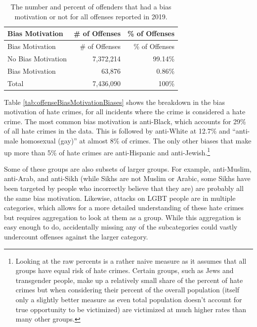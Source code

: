 \documentclass[
  12pt,
  openany]{book}
\begin{document}
\begin{longtable}[]{@{}lrr@{}}
\caption{\label{tab:offenseBiasMotivation}The number and percent of offenders that had a bias motivation or not for all offenses reported in 2019.}\tabularnewline
\toprule
Bias Motivation & \# of Offenses & \% of Offenses\tabularnewline
\midrule
\endfirsthead
\toprule
Bias Motivation & \# of Offenses & \% of Offenses\tabularnewline
\midrule
\endhead
No Bias Motivation & 7,372,214 & 99.14\%\tabularnewline
Bias Motivation & 63,876 & 0.86\%\tabularnewline
Total & 7,436,090 & 100\%\tabularnewline
\bottomrule
\end{longtable}

Table \ref{tab:offenseBiasMotivationBiases} shows the breakdown in the bias motivation of hate crimes, for all incidents where the crime is considered a hate crime. The most common bias motivation is anti-Black, which accounts for 29\% of all hate crimes in the data. This is followed by anti-White at 12.7\% and ``anti-male homosexual (gay)'' at almost 8\% of crimes. The only other biases that make up more than 5\% of hate crimes are anti-Hispanic and anti-Jewish.\footnote{Looking at the raw percents is a rather naive measure as it assumes that all groups have equal risk of hate crimes. Certain groups, such as Jews and transgender people, make up a relatively small share of the percent of hate crimes but when considering their percent of the overall population (itself only a slightly better measure as even total population doesn't account for true opportunity to be victimized) are victimized at much higher rates than many other groups.}

Some of these groups are also subsets of larger groups. For example, anti-Muslim, anti-Arab, and anti-Sikh (while Sikhs are not Muslim or Arabic, some Sikhs have been targeted by people who incorrectly believe that they are) are probably all the same bias motivation. Likewise, attacks on LGBT people are in multiple categories, which allows for a more detailed understanding of these hate crimes but requires aggregation to look at them as a group. While this aggregation is easy enough to do, accidentally missing any of the subcategories could vastly undercount offenses against the larger category.
\end{document}
